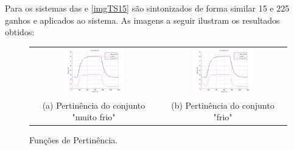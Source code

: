 Para os sistemas das  e \ref{imgTS15} são sintonizados de forma similar 15 e 225 ganhos e aplicados ao sistema. As imagens a seguir ilustram os resultados obtidos:

\begin{figure}[H]
	\centering
	\begin{tabular}{cc}
		\includegraphics[width=0.5\textwidth,keepaspectratio]{img/FM_h1_5_10_15.png} &
		\includegraphics[width=0.5\textwidth,keepaspectratio]{img/FM_h1_5_10_15.png} \\
		(a) Pertinência do conjunto "muito frio" &
		(b) Pertinência do conjunto "frio"
	\end{tabular}
	\caption{\label{imgTS5} Funções de Pertinência.}
\end{figure}

